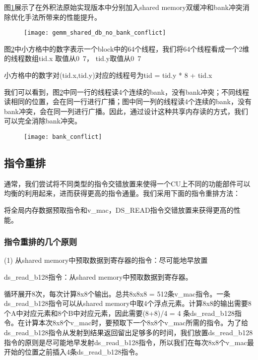 图\ref{fig:gemm_shared_db_no_bank_conflict}展示了在外积法原始实现版本中分别加入shared memory双缓冲和bank冲突消除优化手法所带来的性能提升。
\begin{figure}[htbp]
	\centering
	\texttt{[image: gemm\_shared\_db\_no\_bank\_conflict]}
	\label{fig:gemm_shared_db_no_bank_conflict}
\end{figure}


图\ref{fig:bank_conflict}中小方格中的数字表示一个block中的64个线程，我们将64个线程看成一个2维的线程数组tid.x 取值从0~7， tid.y取值从0~7

小方格中的数字对(tid.x,tid.y)对应的线程号为tid = tid.y * 8 + tid.x

我们可以看到，图\ref{fig:bank_conflict}中同一行的线程读4个连续的bank，没有bank冲突；不同线程读相同的位置，会在同一行进行广播；图中同一列的线程读4个连续的bank，没有bank冲突，会在同一列进行广播。因此，通过设计这种共享内存读的方式，我们可以完全消除bank冲突。
\begin{figure}[htbp]
	\centering
	\texttt{[image: bank\_conflict]}
	\label{fig:bank_conflict}
\end{figure}


\subsection{指令重排}
通常，我们尝试将不同类型的指令交错放置来使得一个CU上不同的功能部件可以均衡的利用起来，进而获得更高的指令通量。我们采用下面的指令重排方法：

将全局内存数据预取指令和v\_mac，DS\_READ指令交错放置来获得更高的性能。

\subsubsection{指令重排的几个原则}
(1) 从shared memory中预取数据到寄存器的指令：尽可能地早放置

ds\_read\_b128指令：从shared memory中预取数据到寄存器。

循环展开8次，每次计算8x8个输出。总共8x8x8 = 512条v\_mac指令。一条ds\_read\_b128指令可以从shared memory中取4个浮点元素。计算8x8的输出需要8个A中对应元素和8个B中对应元素，因此需要(8+8)/4 = 4 条ds\_read\_b128指令。在计算本次8x8个v\_mac时，要预取下一个8x8个v\_mac所需的指令。为了给ds\_read\_b128指令从发射到结果返回留出足够多的时间，我们放置ds\_read\_b128指令的原则是尽可能地早发射ds\_read\_b128指令，所以我们在每次8x8个v\_mac最开始的位置之前插入4条ds\_read\_b128指令。

